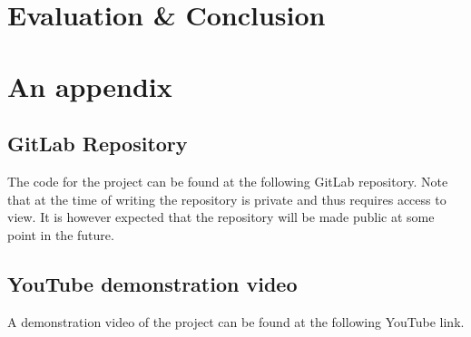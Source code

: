 \documentclass[ twoside,openright,titlepage,numbers=noenddot,headinclude,%
                footinclude=true,cleardoublepage=empty,abstractoff, %
                BCOR=5mm,paper=a4,fontsize=11pt,%
                ngerman,american,%
                ]{scrreprt}
\begin{document}
\chapter{Evaluation \& Conclusion}
\label{cha:evaluation}





\appendix
\cleardoublepage

\chapter{An appendix}
\label{cha:an-appendix}

\section{GitLab Repository}
The code for the project can be found at the following GitLab repository. Note that at the time of writing the repository is private and thus requires access to view. It is however expected that the repository will be made public at some point in the future.\\

\section{YouTube demonstration video}
A demonstration video of the project can be found at the following YouTube link.\\




\cleardoublepage

\end{document}
